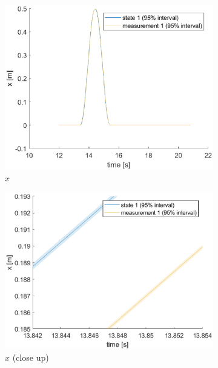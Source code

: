 \documentclass[a4paper,kul]{kulakarticle} %
\begin{document}
\begin{figure}[htp!]
	\centering
	\begin{subfigure}[b]{0.48\textwidth}
		\centering
		\includegraphics[width=\textwidth]{state1_ext.eps}
		\caption{$x$}
	\end{subfigure}
	\hfill
	\begin{subfigure}[b]{0.48\textwidth}  
		\centering 
		\includegraphics[width=\textwidth]{state1_closeup_ext.eps}
		\caption{$x$ (close up)}
	\end{subfigure}
	\begin{subfigure}[b]{0.48\textwidth}
		\centering

\end{subfigure}
\end{figure}
\end{document}
